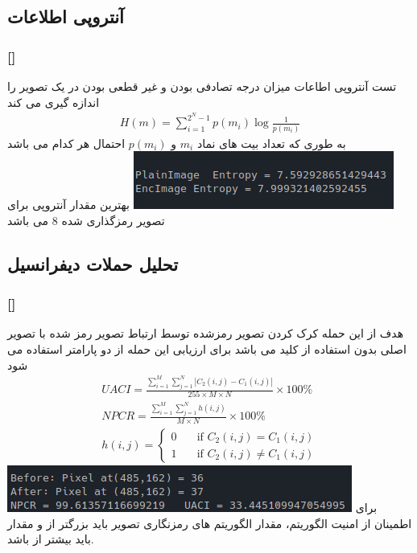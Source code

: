 \documentclass[xcolor=dvipsnames, professionalfonts, 11pt]{beamer}
\newcommand*{\makeframetitle}{\frametitle{\insertsection \hspace{0.1em} {\footnotesize [\insertsubsection]}}}
\begin{document}
\subsection{آنتروپی اطلاعات}
\begin{frame}
    \makeframetitle
    تست آنتروپی اطاعات میزان درجه تصادفی بودن و غیر قطعی بودن در یک تصویر را اندازه گیری می کند
    \begin{align}
        H(m) = \sum_{i=1}^{2^N - 1} p(m_i) \log \frac{1}{p(m_i)}
    \end{align}
    به طوری که  تعداد بیت های نماد \(m_i\) و \(p(m_i)\) احتمال هر کدام می باشد
    \includegraphics[width=\textwidth]{assets/result10.png}
    بهترین مقدار آنتروپی برای تصویر رمزگذاری شده 8 می باشد
\end{frame}

\subsection{تحلیل حملات دیفرانسیل}
\begin{frame}[allowframebreaks]
    \makeframetitle
    هدف از این حمله کرک کردن تصویر رمزشده   توسط ارتباط تصویر رمز شده با تصویر اصلی بدون استفاده از کلید می باشد
   برای ارزیابی این حمله از دو پارامتر  استفاده می شود
   \begin{align}
    UACI = \frac{\sum_{i=1}^{M}\sum_{j=1}^{N}|C_2(i, j) - C_1(i, j)|}{255 \times M \times N} \times 100\%\\
    NPCR = \frac{\sum_{i=1}^{M}\sum_{j=1}^{N} h(i, j)}{M \times N} \times 100\%\\
    h(i, j) = \begin{cases}
        0 & \quad \text{if } C_2(i, j) = C_1(i, j)\\
        1 & \quad \text{if } C_2(i, j) \neq C_1(i, j)
    \end{cases}
   \end{align}
   \includegraphics[width=\textwidth]{assets/result11.png}
   برای اطمینان از امنیت الگوریتم، مقدار  الگوریتم های رمزنگاری تصویر باید بزرگتر از  و مقدار  باید بیشتر از  باشد.
\end{frame}
\end{document}
